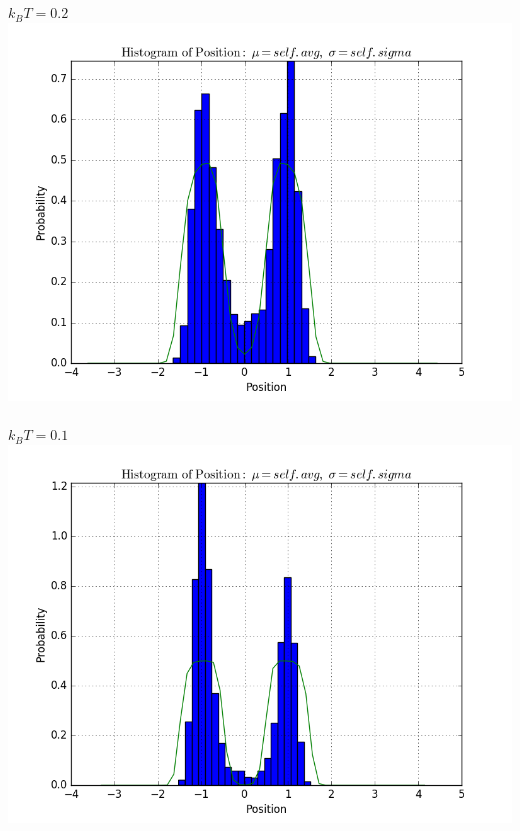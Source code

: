 \documentclass[11pt, oneside]{article}   	%
\begin{document}
\subsection{}
\paragraph{}
$k_B T = 0.2$
\includegraphics[scale = 0.5]{hist2.png}
\paragraph{}
$k_B T = 0.1$
\includegraphics[scale = 0.5]{hist1.png}
\end{document}
